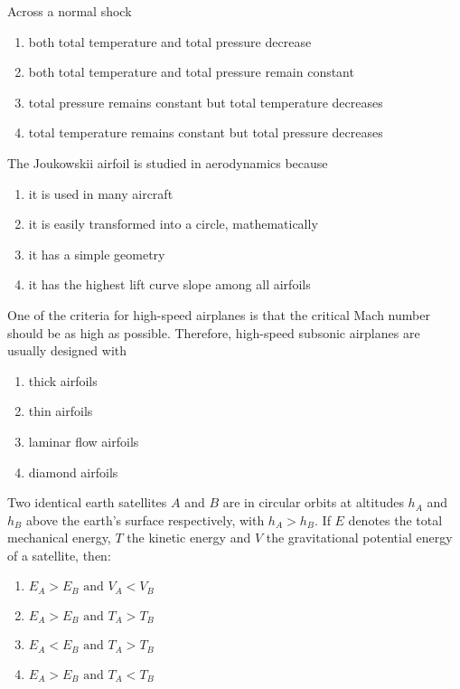 \iffalse
\chapter{2007}
\author{EE24BTECH11015 - Dhawal}
\section{ae}
\fi
	\item Across a normal shock
\begin{enumerate}
\item both total temperature and total pressure decrease 
\item both total temperature and total pressure remain constant 
\item total pressure remains constant but total temperature decreases 
\item total temperature remains constant but total pressure decreases
\end{enumerate}

\item  The Joukowskii airfoil is studied in aerodynamics because
\begin{enumerate}
\item it is used in many aircraft
\item it is easily transformed into a circle, mathematically
\item it has a simple geometry
\item it has the highest lift curve slope among all airfoils
\end{enumerate}

\item  One of the criteria for high-speed airplanes is that the critical Mach number should be as high as possible. Therefore, high-speed subsonic airplanes are usually designed with 
\begin{multicols}{2}
\begin{enumerate}
\item thick airfoils
\item thin airfoils
\item laminar flow airfoils
\item diamond airfoils
\end{enumerate}
\end{multicols}

\item  Two identical earth satellites $A$ and $B$ are in circular orbits at altitudes $h_A$ and $h_B$ above the earth's surface respectively, with $h_A > h_B$. If $E$ denotes the total mechanical energy, $T$ the kinetic energy and $V$ the gravitational potential energy of a satellite, then:
\begin{multicols}{2}
\begin{enumerate}
\item $E_A > E_B \text{ and } V_A < V_B$
\item $E_A > E_B \text{ and } T_A > T_B$
\item $E_A < E_B \text{ and } T_A > T_B$
\item $E_A > E_B \text{ and } T_A < T_B$
\end{enumerate}
\end{multicols}

